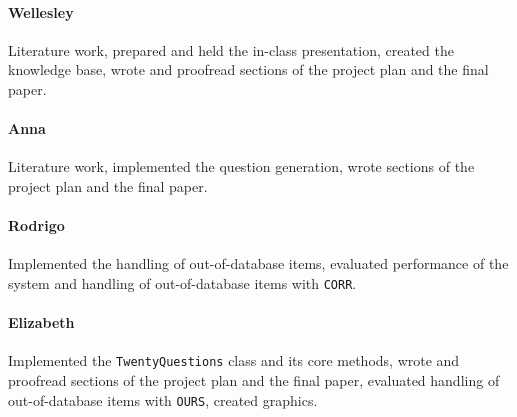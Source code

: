 \documentclass[11pt,a4paper]{article}
\begin{document}
\paragraph{Wellesley} Literature work, prepared and held the in-class presentation, created the knowledge base, wrote and proofread sections of the project plan and the final paper.

\paragraph{Anna} Literature work, implemented the question generation, wrote sections of the project plan and the final paper.

\paragraph{Rodrigo} Implemented the handling of out-of-database items, evaluated performance of the system and handling of out-of-database items with \texttt{CORR}.

\paragraph{Elizabeth} Implemented the \texttt{TwentyQuestions} class and its core methods, wrote and proofread sections of the project plan and the final paper, evaluated handling of out-of-database items with \texttt{OURS}, created graphics.
\end{document}
